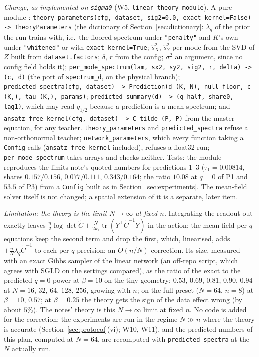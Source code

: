 \documentclass[11pt,a4paper]{article}
\newcommand{\tr}{\operatorname{tr}}
\newcommand{\sX}{\hat s_X^2}
\newcommand{\sY}{\hat s_Y^2}
\newcommand{\code}[1]{\texttt{#1}}
\begin{document}
\emph{Change, as implemented on \code{sigma0}} (W5, \code{linear-theory-module}). A pure module : \code{theory\_parameters(cfg, dataset, sig2=0.0, exact\_kernel=False) -> TheoryParameters} (the dictionary of Section~\ref{sec:dictionary}: $\lambda_q$ of the prior the run trains with, i.e.\ the floored spectrum under \code{"penalty"} and $K$'s own under \code{"whitened"} or with \code{exact\_kernel=True}; $\sX$, $\sY$ per mode from the SVD of $Z$ built from \code{dataset.factors}; $\delta$, $r$ from the config; $\sigma^2$ an argument, since no config field holds it); \code{per\_mode\_spectrum(lam, sx2, sy2, sig2, r, delta) -> (c, d)} (the port of \code{spectrum\_d}, on the physical branch); \code{predicted\_spectra(cfg, dataset) -> Prediction(d (K, N), null\_floor, c (K,), tau (K,), params)}; \code{predicted\_summary(d) -> (q\_half, share0, lag1)}, which may read $q_{1/2}$ because a prediction is a mean spectrum; and \code{ansatz\_free\_kernel(cfg, dataset) -> C\_tilde (P, P)} from the master equation, for any teacher. \code{theory\_parameters} and \code{predicted\_spectra} refuse a non-orthonormal teacher; \code{network\_parameters}, which every function taking a \code{Config} calls (\code{ansatz\_free\_kernel} included), refuses a float32 run; \code{per\_mode\_spectrum} takes arrays and checks neither. Tests: the module reproduces the limits note's quoted numbers for predictions 1--3 ($\tau_1 = 0.00814$, shares $0.157/0.156$, $0.077/0.111$, $0.343/0.164$; the ratio $10.08$ at $q = 0$ of P1 and $53.5$ of P3) from a \code{Config} built as in Section~\ref{sec:experiments}. The mean-field solver itself is not changed; a spatial extension of it is a separate, later item.

\emph{Limitation: the theory is the limit $N\to\infty$ at fixed $n$.} Integrating the readout out exactly leaves $\frac n2\log\det\tilde C + \frac N{2k_1}\tr(Y^\top\tilde C^{-1}Y)$ in the action; the mean-field per-$q$ equations keep the second term and drop the first, which, linearised, adds $+\frac nN\lambda_q\tilde C^{-1}$ to each per-$q$ precision: an $O(n/N)$ correction. Its size, measured with an exact Gibbs sampler of the linear network (an off-repo script, which agrees with SGLD on the settings compared), as the ratio of the exact to the predicted $q = 0$ power at $\beta = 10$ on the tiny geometry: $0.53$, $0.69$, $0.81$, $0.90$, $0.94$ at $N = 16$, $32$, $64$, $128$, $256$, growing with $n$; on the full preset ($N = 64$, $n = 8$) at $\beta = 10$, $0.57$; at $\beta = 0.25$ the theory gets the sign of the data effect wrong (by about $5\%$). The notes' theory is this $N\to\infty$ limit at fixed $n$. No code is added for the correction: the experiments are run in the regime $N\gg n$ where the theory is accurate (Section~\ref{sec:protocol}(vi); W10, W11), and the predicted numbers of this plan, computed at $N = 64$, are recomputed with \code{predicted\_spectra} at the $N$ actually run.
\end{document}

